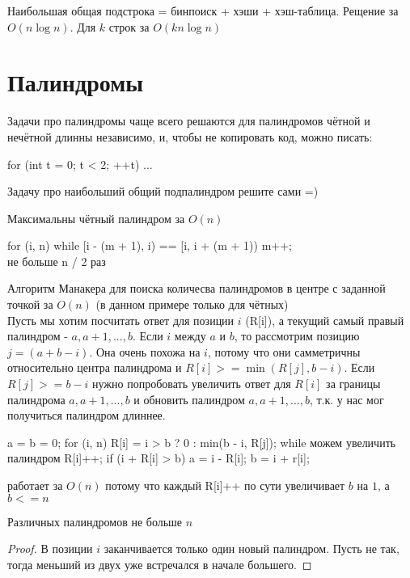 \begin{Rem}
Наибольшая общая подстрока = бинпоиск + хэши + хэш-таблица. Рещение за $O(n \log n)$. Для $k$ строк за  $O(kn \log n)$
\end{Rem}
\section{Палиндромы}
Задачи про палиндромы чаще всего решаются для палиндромов чётной и нечётной длинны независимо, и, чтобы не копировать код, можно писать:
\begin{cppcode}
for (int t = 0; t < 2; ++t) {
	...
}
\end{cppcode}

Задачу про наибольший общий подпалиндром решите сами =)

Максимальны чётный палиндром за $O(n)$
\begin{cppcode}
for (i, n) {
	while [i - (m + 1), i) == [i, i + (m + 1)) {
		m++; \\ не больше n / 2 раз
	}
}
\end{cppcode}
Алгоритм Манакера для поиска количесва палиндромов в центре с заданной точкой за $O(n)$ (в данном примере только для чётных)\\
Пусть мы хотим посчитать ответ для позиции $i$ (R[i]), а текущий самый правый палиндром - $a, a + 1, ..., b$. Если $i$ между $a$ и $b$, то рассмотрим позицию $j = (a + b - i)$. Она очень похожа на $i$, потому что они самметричны относительно центра палиндрома и $R[i] >= \min(R[j], b - i)$. Если $R[j] >= b - i$ нужно попробовать увеличить ответ для $R[i]$  за границы палиндрома $a, a + 1, ...,  b$ и обновить палиндром $a, a + 1, ...,  b$, т.к. у нас мог получиться палиндром длиннее.
\\
\begin{cppcode}
a = b = 0;
for (i, n) {
	R[i] = i > b ? 0 : min(b - i, R[j]);
	while можем увеличить палиндром {
		R[i]++;
	}
	if (i + R[i] > b) {
		a = i - R[i];
		b = i + r[i];
	}
}
\end{cppcode}
работает за $O(n)$ потому что каждый R[i]++ по сути увеличивает $b$ на $1$, а $b <= n$

\begin{theorem}
Различных палиндромов не больше $n$
\end{theorem}
\begin{proof}
В позиции $i$ заканчивается только один новый палиндром. Пусть не так, тогда меньший из двух уже встречался в начале большего. 
\end{proof}

